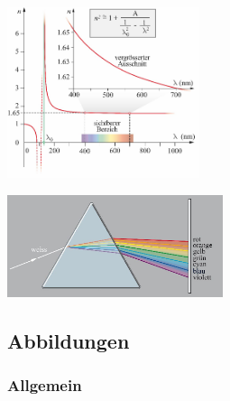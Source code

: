 \begin{center}
	\begin{minipage}{0.25\textwidth}
		\includegraphics[height=5cm,keepaspectratio=true]{Images/dispersion_graph.png}
	\end{minipage}%
	\begin{minipage}{0.3\textwidth}
		\includegraphics[height=3cm,keepaspectratio=true]{Images/dispersion_prisma.png}
	\end{minipage}
\end{center}


\subsection{Abbildungen}
\subsubsection{Allgemein}
 \\
\begin{center}
	\begin{minipage}{0.3\textwidth}
		 \\
		 \\
	\end{minipage}%
	\begin{minipage}{0.3\textwidth}
		 \\
		 \\
	\end{minipage}
\end{center}

